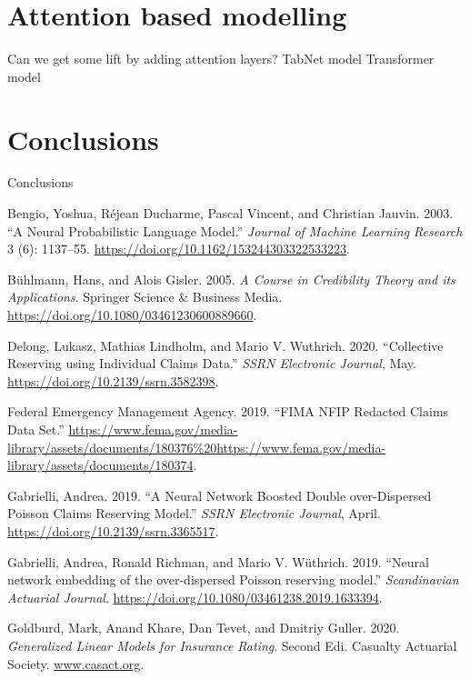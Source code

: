 \documentclass{article}
\newlength{\cslhangindent}
\newenvironment{cslreferences}%
  {\setlength{\parindent}{0pt}%
  \everypar{\setlength{\hangindent}{\cslhangindent}}\ignorespaces}%
  {\par}
\begin{document}
\hypertarget{attention}{%
\section{Attention based modelling}\label{attention}}

Can we get some lift by adding attention layers? TabNet model
Transformer model

\hypertarget{Conclusions}{%
\section{Conclusions}\label{Conclusions}}

Conclusions

\hypertarget{refs}{}
\begin{cslreferences}
\leavevmode\hypertarget{ref-Bengio2003}{}%
Bengio, Yoshua, Réjean Ducharme, Pascal Vincent, and Christian Jauvin.
2003. ``A Neural Probabilistic Language Model.'' \emph{Journal of
Machine Learning Research} 3 (6): 1137--55.
\url{https://doi.org/10.1162/153244303322533223}.

\leavevmode\hypertarget{ref-Buhlmann2006}{}%
Bühlmann, Hans, and Alois Gisler. 2005. \emph{A Course in Credibility
Theory and its Applications}. Springer Science \& Business Media.
\url{https://doi.org/10.1080/03461230600889660}.

\leavevmode\hypertarget{ref-Delong2020a}{}%
Delong, Lukasz, Mathias Lindholm, and Mario V. Wuthrich. 2020.
``Collective Reserving using Individual Claims Data.'' \emph{SSRN
Electronic Journal}, May. \url{https://doi.org/10.2139/ssrn.3582398}.

\leavevmode\hypertarget{ref-FederalEmergencyManagementAgency2019}{}%
Federal Emergency Management Agency. 2019. ``FIMA NFIP Redacted Claims
Data Set.''
\url{https://www.fema.gov/media-library/assets/documents/180376\%20https://www.fema.gov/media-library/assets/documents/180374}.

\leavevmode\hypertarget{ref-Gabrielli2019c}{}%
Gabrielli, Andrea. 2019. ``A Neural Network Boosted Double
over-Dispersed Poisson Claims Reserving Model.'' \emph{SSRN Electronic
Journal}, April. \url{https://doi.org/10.2139/ssrn.3365517}.

\leavevmode\hypertarget{ref-Gabrielli2019}{}%
Gabrielli, Andrea, Ronald Richman, and Mario V. Wüthrich. 2019. ``Neural
network embedding of the over-dispersed Poisson reserving model.''
\emph{Scandinavian Actuarial Journal}.
\url{https://doi.org/10.1080/03461238.2019.1633394}.

\leavevmode\hypertarget{ref-Goldburd}{}%
Goldburd, Mark, Anand Khare, Dan Tevet, and Dmitriy Guller. 2020.
\emph{Generalized Linear Models for Insurance Rating}. Second Edi.
Casualty Actuarial Society. \url{www.casact.org}.


\end{cslreferences}
\end{document}
